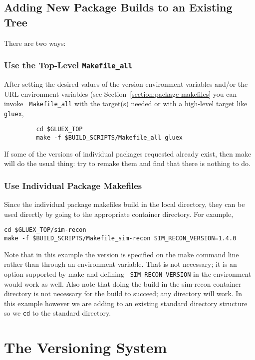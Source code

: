\documentclass[12pt]{article}
\begin{document}
\subsection{Adding New Package Builds to an Existing Tree}\label{section:adding-packages}

There are two ways:

\subsubsection{Use the Top-Level {\tt Makefile\_all}}

After setting the desired values of the version environment variables
and/or the URL environment variables (see
Section~\ref{section:package-makefiles} you can invoke {\tt
  Makefile\_all} with the target(s) needed or with a high-level target
like {\tt gluex},
\begin{verbatim}
         cd $GLUEX_TOP
         make -f $BUILD_SCRIPTS/Makefile_all gluex
\end{verbatim}
If some of the versions of individual packages requested already
exist, then make will do the usual thing: try to remake them and find
that there is nothing to do.

\subsubsection{Use Individual Package Makefiles}

Since the individual package makefiles build in the local directory,
they can be used directly by going to the appropriate container
directory. For example,
\begin{verbatim}
cd $GLUEX_TOP/sim-recon
make -f $BUILD_SCRIPTS/Makefile_sim-recon SIM_RECON_VERSION=1.4.0
\end{verbatim}
Note that in this example the version is specified on the make command
line rather than through an environment variable. That is not
necessary; it is an option supported by make and defining {\tt
  SIM\_RECON\_VERSION} in the environment would work as well. Also
note that doing the build in the sim-recon container directory is not
necessary for the build to succeed; any directory will work. In this
example however we are adding to an existing standard directory
structure so we {\tt cd} to the standard directory.

\section{The Versioning System}\label{section:versioning}
\end{document}
